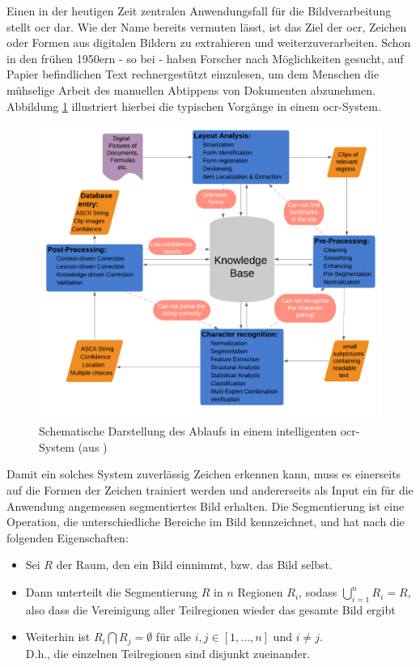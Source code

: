 	Einen in der heutigen Zeit zentralen Anwendungsfall für die Bildverarbeitung stellt \gls{ocr} dar. Wie der Name bereits vermuten lässt, ist das Ziel der \gls{ocr}, Zeichen oder Formen aus digitalen Bildern zu extrahieren und weiterzuverarbeiten. Schon in den frühen 1950ern - so bei \cite{cher-et-al-ocr} - haben Forscher nach Möglichkeiten gesucht, auf Papier befindlichen Text rechnergestützt einzulesen, um dem Menschen die mühselige Arbeit des manuellen Abtippens von Dokumenten abzunehmen. Abbildung \ref{fig:ocr-system} illustriert hierbei die typischen Vorgänge in einem \gls{ocr}-System. 
	
	\begin{figure}[H]
		\centering
		\includegraphics[width=0.7\linewidth]{Ablauf-OCR_Cheriet-et-al}
		\caption[typisches \gls{ocr}-Ablaufschema]{Schematische Darstellung des Ablaufs in einem intelligenten \gls{ocr}-System (aus \cite{cher-et-al-ocr})}
		\label{fig:ocr-system}
	\end{figure}

	Damit ein solches System zuverlässig Zeichen erkennen kann, muss es einerseits auf die Formen der Zeichen trainiert werden und andererseits als Input ein für die Anwendung angemessen segmentiertes Bild erhalten. Die Segmentierung ist eine Operation, die unterschiedliche Bereiche im Bild kennzeichnet, und hat nach \cite[S. 690 f]{gonzalez-woods}
	die folgenden Eigenschaften:
	\begin{itemize}
		\item Sei $R$ der Raum, den ein Bild einnimmt, bzw. das Bild selbst.
		\item Dann unterteilt die Segmentierung $R$ in $n$ Regionen $R_{i}$, sodass $\bigcup\limits_{i=1}^{n} R_{i} = R$, also dass die Vereinigung aller Teilregionen wieder das gesamte Bild ergibt
		\item Weiterhin ist $R_{i} \bigcap R_{j} = \emptyset $ für alle $i, j \in [1, ... , n]$ und $i \neq j$. \\
		D.h., die einzelnen Teilregionen sind disjunkt zueinander.
	\end{itemize}
		